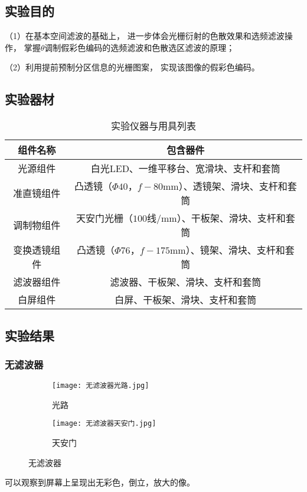 \documentclass[11pt]{article}
\begin{document}
	\subsection{实验目的}
	
	（1）在基本空间滤波的基础上，
	进一步体会光栅衍射的色散效果和选频滤波操作，
	掌握$\theta$调制假彩色编码的选频滤波和色散选区滤波的原理；
	
	（2）利用提前预制分区信息的光栅图案，
	实现该图像的假彩色编码。
	
	
	
	\subsection{实验器材}
	
	\begin{table}[H]
		\centering
		\begin{tabular}{cc}
			\toprule
			组件名称 & 包含器件\\ \midrule
			光源组件& 白光LED、一维平移台、宽滑块、支杆和套筒\\ 
			准直镜组件& 凸透镜（$\Phi 40$，$f-80$mm）、透镜架、滑块、支杆和套筒 \\ 
			调制物组件& 天安门光栅（$100$线/mm）、干板架、滑块、支杆和套筒\\ 
			变换透镜组件& 凸透镜（$\Phi 76$，$f-175$mm）、镜架、滑块、支杆和套筒\\ 
			滤波器组件& 滤波器、干板架、滑块、支杆和套筒\\ 
			白屏组件& 白屏、干板架、滑块、支杆和套筒\\ 
			\bottomrule
		\end{tabular}
		\caption{实验仪器与用具列表}
	\end{table}
	
	\subsection{实验结果}
	\subsubsection{无滤波器}
	\begin{figure}[H]
		\centering
		\begin{subfigure}[t]{0.45\textwidth}  %
			\centering
			\texttt{[image: 无滤波器光路.jpg]}  %
			\caption{光路}
		\end{subfigure}
		\begin{subfigure}[t]{0.45\textwidth}  %
			\centering
			\texttt{[image: 无滤波器天安门.jpg]}  %
			\caption{天安门}
		\end{subfigure}
		\caption{无滤波器}
		\label{fig:无滤波器}
	\end{figure}
	可以观察到屏幕上呈现出无彩色，倒立，放大的像。
	
\end{document}

